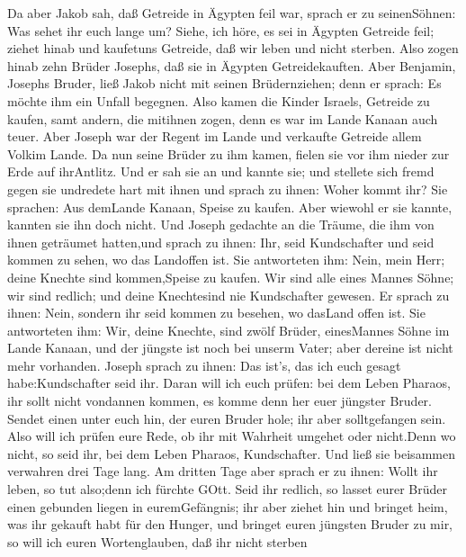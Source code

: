  Da aber Jakob sah, daß Getreide in Ägypten feil war, sprach
er zu seinenSöhnen: Was sehet ihr euch lange um?  Siehe, ich
höre, es sei in Ägypten Getreide feil; ziehet hinab und kaufetuns
Getreide, daß wir leben und nicht sterben.  Also zogen hinab
zehn Brüder Josephs, daß sie in Ägypten Getreidekauften. 
Aber Benjamin, Josephs Bruder, ließ Jakob nicht mit seinen
Brüdernziehen; denn er sprach: Es möchte ihm ein Unfall begegnen.
 Also kamen die Kinder Israels, Getreide zu kaufen, samt
andern, die mitihnen zogen, denn es war im Lande Kanaan auch teuer.
 Aber Joseph war der Regent im Lande und verkaufte Getreide
allem Volkim Lande. Da nun seine Brüder zu ihm kamen, fielen sie vor ihm
nieder zur Erde auf ihrAntlitz.  Und er sah sie an und
kannte sie; und stellete sich fremd gegen sie undredete hart mit ihnen
und sprach zu ihnen: Woher kommt ihr? Sie sprachen: Aus demLande Kanaan,
Speise zu kaufen.  Aber wiewohl er sie kannte, kannten sie
ihn doch nicht.  Und Joseph gedachte an die Träume, die ihm
von ihnen geträumet hatten,und sprach zu ihnen: Ihr, seid Kundschafter
und seid kommen zu sehen, wo das Landoffen ist.  Sie
antworteten ihm: Nein, mein Herr; deine Knechte sind kommen,Speise zu
kaufen.  Wir sind alle eines Mannes Söhne; wir sind
redlich; und deine Knechtesind nie Kundschafter gewesen. 
Er sprach zu ihnen: Nein, sondern ihr seid kommen zu besehen, wo dasLand
offen ist.  Sie antworteten ihm: Wir, deine Knechte, sind
zwölf Brüder, einesMannes Söhne im Lande Kanaan, und der jüngste ist
noch bei unserm Vater; aber dereine ist nicht mehr vorhanden.
 Joseph sprach zu ihnen: Das ist's, das ich euch gesagt
habe:Kundschafter seid ihr.  Daran will ich euch prüfen:
bei dem Leben Pharaos, ihr sollt nicht vondannen kommen, es komme denn
her euer jüngster Bruder.  Sendet einen unter euch hin, der
euren Bruder hole; ihr aber solltgefangen sein. Also will ich prüfen
eure Rede, ob ihr mit Wahrheit umgehet oder nicht.Denn wo nicht, so seid
ihr, bei dem Leben Pharaos, Kundschafter.  Und ließ sie
beisammen verwahren drei Tage lang.  Am dritten Tage aber
sprach er zu ihnen: Wollt ihr leben, so tut also;denn ich fürchte GOtt.
 Seid ihr redlich, so lasset eurer Brüder einen gebunden
liegen in euremGefängnis; ihr aber ziehet hin und bringet heim, was ihr
gekauft habt für den Hunger,  und bringet euren jüngsten
Bruder zu mir, so will ich euren Wortenglauben, daß ihr nicht sterben
